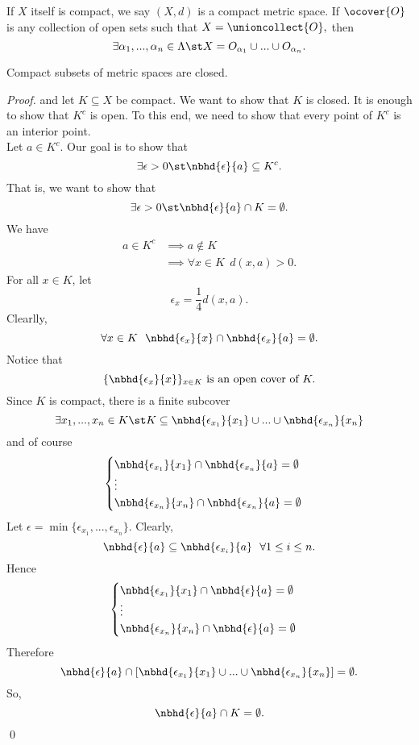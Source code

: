 \documentclass[a4paper]{article}
\begin{document}
	\begin{remark}
		If $X$ itself is compact, we say $(X,d)$ is a compact metric space.
		If $\ocover{O}$ is any collection of open sets such that $X= \unioncollect{O},$ then
		$$\exists \alpha_{1}, ..., \alpha_n \in \Lambda \st X = O_{\alpha_1} \cup ... \cup O_{\alpha_n}.$$
	\end{remark}
	
	\begin{theorem}
		Compact subsets of metric spaces are closed.
	\end{theorem}
	\begin{proof}
		\routineMS and let $K\subseteq X$ be compact. We want to show that $K$ is closed. It is enough to show that $K^c$ is open. To this end, we need to show that every point of $K^c$ is an interior point. \\
		Let $a\in K^c$. Our goal is to show that $$\exists \epsilon > 0 \st \nbhd{\epsilon}{a} \subseteq K^c.$$
		That is, we want to show that $$\exists \epsilon > 0 \st \nbhd{\epsilon}{a} \cap K = \emptyset.$$
		We have
		\begin{align*}
			a \in K^c &\implies a \not \in K \\
			&\implies \forall x \in K ~~ d(x,a) > 0.
		\end{align*}
		For all $x\in K$, let $$\epsilon_x = \frac{1}{4}d(x,a).$$
		Clearlly, $$\forall x \in K ~~ \nbhd{\epsilon_x}{x} \cap \nbhd{\epsilon_x}{a} = \emptyset.$$
		Notice that $$\{\nbhd{\epsilon_x}{x}\}_{x\in K} \text { is an open cover of } K.$$
		Since $K$ is compact, there is a finite subcover $$\exists x_1,..., x_n \in K \st K \subseteq \nbhd{\epsilon_{x_1}}{x_1} \cup ... \cup \nbhd{\epsilon_{x_n}}{x_n}$$
		and of course
		$$\begin{cases}
			\nbhd{\epsilon_{x_1}}{x_1}\cap \nbhd{\epsilon_{x_n}}{a} = \emptyset \\
			\vdots \\
			\nbhd{\epsilon_{x_n}}{x_n}\cap \nbhd{\epsilon_{x_n}}{a} = \emptyset
		\end{cases}$$
		Let $\epsilon=\min\{\epsilon_{x_1}, ..., \epsilon_{x_n}\}$. Clearly,
		$$\nbhd{\epsilon}{a} \subseteq \nbhd{\epsilon_{x_i}}{a} ~~ \forall 1 \leq i \leq n.$$
		Hence
		$$\begin{cases}
			\nbhd{\epsilon_{x_1}}{x_1} \cap \nbhd{\epsilon}{a} = \emptyset \\
			\vdots \\
			\nbhd{\epsilon_{x_n}}{x_n} \cap \nbhd{\epsilon}{a} = \emptyset
		\end{cases}$$
		Therefore
		$$
		\nbhd{\epsilon}{a} \cap [ \nbhd{\epsilon_{x_1}}{x_1}\cup ... \cup \nbhd{\epsilon_{x_n}}{x_n}] =\emptyset.
		$$
		So,
		$$
			\nbhd{\epsilon}{a} \cap K = \emptyset.
		$$
		\qed
	\end{proof}
	
\end{document}
